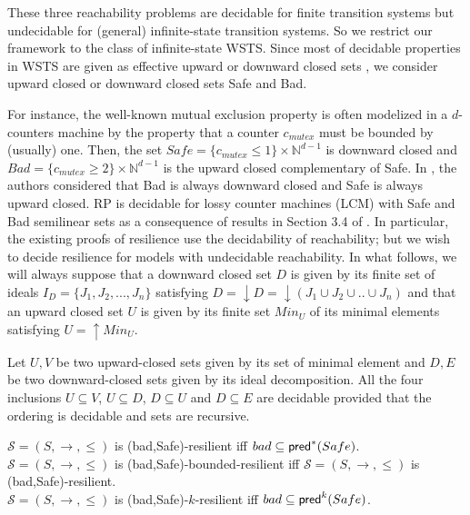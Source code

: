 These three reachability problems are decidable for finite transition systems but undecidable for (general) infinite-state transition systems. 
So we restrict our framework to the class of infinite-state WSTS. Since most of decidable properties in WSTS are given as effective upward or downward closed sets \cite{DBLP:journals/iandc/AbdullaCJT00, DBLP:journals/tcs/FinkelS01}, we consider upward closed or downward closed sets Safe and Bad.

For instance, the well-known mutual exclusion property is often modelized in a $d$-counters machine by the property that a counter $c_{mutex}$ must be bounded by (usually) one. Then, the set $Safe =  \{c_{mutex} \leq 1\} \times \mathbb{N}^{d-1}$ is downward closed and $Bad =\{c_{mutex} \geq 2\} \times  \mathbb{N}^{d-1} $ is the upward closed complementary of Safe. In \cite{DBLP:conf/gg/Ozkan22}, the authors considered that Bad is always downward closed and Safe is always upward closed.
%		
RP is decidable for lossy counter machines (LCM) with Safe and Bad semilinear sets as a consequence of results in Section 3.4 of \cite{DBLP:conf/rp/Schnoebelen10}. In particular, the existing proofs of resilience use the decidability of reachability; but we wish to decide resilience for models with undecidable reachability.
%
In what follows, we will always suppose that a downward closed set $D$ is given by its finite set of ideals $I_D=\{J_1, J_2,...,J_n\}$ satisfying $D=\downarrow D = \downarrow (J_1 \cup J_2 \cup..\cup J_n)$ and that an upward closed set $U$ is given by its finite set $Min_U$ of its minimal elements satisfying $U=\uparrow Min_U$.

Let $U,V$ be two upward-closed sets given by its set of minimal element and $D,E$ be two downward-closed sets given by its ideal decomposition. All the four  inclusions $U \subseteq V$,  $U \subseteq D$, $D \subseteq U$ and $D \subseteq E$ are decidable provided that the ordering is decidable and sets are recursive.
%


\begin{proposition}\label{general}
$\mathscr{S}=(S,\rightarrow,\leq)$ is %
(bad,Safe)-resilient iff $bad \subseteq \textsf{pred}^*(Safe)$.\\
$\mathscr{S}=(S,\rightarrow,\leq)$ is %
(bad,Safe)-bounded-resilient iff $\mathscr{S}=(S,\rightarrow,\leq)$ is %
(bad,Safe)-resilient.\\
$\mathscr{S}=(S,\rightarrow,\leq)$ is %
(bad,Safe)-$k$-resilient iff $bad \subseteq \textsf{pred}^k(Safe)$.
\end{proposition}

